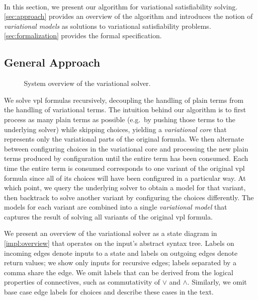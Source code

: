~\label{chapter:vsat}

In this section, we present our algorithm for variational satisfiability
solving. \autoref{sec:approach} provides an overview of the algorithm and
introduces the notion of \emph{variational models} as solutions to variational
satisfiability problems. \autoref{sec:formalization} provides the formal
specification.


\subsection{General Approach}
\label{sec:approach}

\begin{figure}
  \centering
    
    \caption{System overview of the variational solver.}%
    \label{impl:overview}
\end{figure}

We solve \ac{vpl} formulas recursively, decoupling the handling of plain
terms from the handling of variational terms.
%
The intuition behind our algorithm is to first process as many plain terms as
possible (e.g.\ by pushing those terms to the underlying solver) while skipping
choices, yielding a \emph{variational core} that represents only the
variational parts of the original formula. We then alternate between
configuring choices in the variational core and processing the new plain terms
produced by configuration until the entire term has been consumed.
%
Each time the entire term is consumed corresponds to one variant of the
original \ac{vpl} formula since all of its choices will have been configured in a
particular way. At which point, we query the underlying solver to obtain a
model for that variant, then backtrack to solve another variant by configuring
the choices differently. The models for each variant are combined into a single
\emph{variational model} that captures the result of solving all variants of
the original \ac{vpl} formula.


We present an overview of the variational solver as a state diagram in
\autoref{impl:overview} that operates on the input's abstract syntax tree.
Labels on incoming edges denote inputs to a state and labels on outgoing edges
denote return values; we show only inputs for recursive edges; labels separated
by a comma share the edge. We omit labels that can be derived from the logical
properties of connectives, such as commutativity of $\vee$ and $\wedge$.
Similarly, we omit base case edge labels for choices and describe these cases
in the text.

